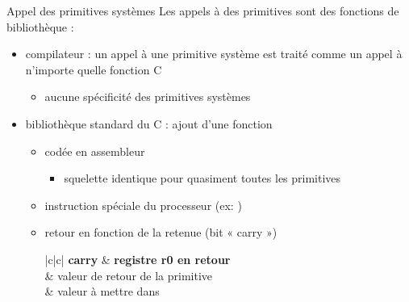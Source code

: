 \begin {frame} {Appel des primitives systèmes}
    Les appels à des primitives sont des fonctions de bibliothèque :
    \begin {itemize}
	\item compilateur : un appel à une primitive
	    système est traité comme un appel à n'importe quelle
	    fonction C

	    \begin {itemize}
		\item aucune spécificité des primitives systèmes
	    \end {itemize}

	\item bibliothèque standard du C : ajout d'une fonction

	    \begin {itemize}
		\item codée en assembleur
		    \begin {itemize}
			\item squelette identique pour quasiment
			    toutes les primitives
		    \end {itemize}
		\item instruction spéciale du processeur (ex: )
		\item retour en fonction de la retenue (bit « carry »)

		    \ctableau {\fD} {|c|c|} {
			\rc \textbf {carry} & \textbf {registre r0 en retour}
			    \\
			 & valeur de retour de la primitive \\
			 & valeur à mettre dans  \\
		    }
	    \end {itemize}
    \end {itemize}
\end {frame}



